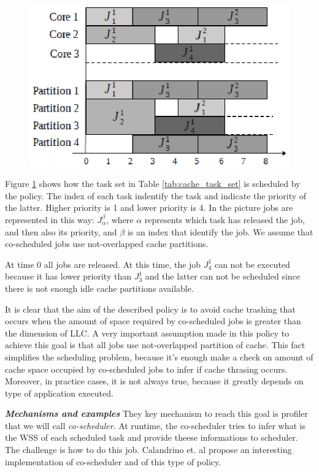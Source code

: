 \begin{description}
\begin{figure}[htbp]
\centering
\includegraphics[width=\widefigure]{images/schedule.eps}
\caption{}
\label{fig:sched_example}
\end{figure}

Figure \ref{fig:sched_example} shows how the task set in Table \ref{tab:cache_task_set} is scheduled by the policy. The index of each task 
indentify the task and indicate the priority of the latter. Higher priority is 1 and lower priority is 4. In the picture jobs are represented in this way: 
$J_{\alpha}^\beta$, where $\alpha$ represents which task has released the job, and then also its priority, and $\beta$ is an index that identify the job.
We assume that co-scheduled jobs use not-overlapped cache partitions.

At time 0 all jobs are released. At this time, the job $J_{4}^1$ can not be executed because it has lower priority than $J_{3}^1$ and the latter can not be
scheduled since there is not enough idle cache partitions available.

It is clear that the aim of the described policy is to avoid cache trashing that occurs when the amount of space required by co-scheduled jobs is greater 
than the dimension of LLC. A very important assumption made in this policy to achieve this goal is that all jobs use not-overlapped 
partition of cache. This fact simplifies the scheduling problem, because it's enough make a check on amount of cache space occupied by co-scheduled jobs to 
infer if cache thrasing occurs. Moreover, in practice cases, it is not always true, because it greatly depends on type of application executed.


\textit{\textbf{Mechanisms and examples}} They key mechanism to reach this goal is profiler that we will call \textit{co-scheduler}. At runtime, the 
co-scheduler tries to infer what is the WSS of each scheduled task and provide theese informations to scheduler. The challenge is how to do this job. 
Calandrino et. al \cite{calandro} propose an interesting implementation of co-scheduler and of this type of policy.


\end{description}
